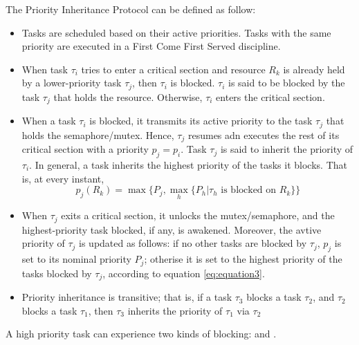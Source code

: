 The Priority Inheritance Protocol can be defined as follow:
\begin{itemize}
    \item Tasks are scheduled based on their active priorities. Tasks with the same priority are executed in a First Come First Served discipline.
    \item When task $\tau_i$ tries to enter a critical section and resource $R_k$ is already held by a lower-priority task $\tau_j$, then $\tau_i$ is blocked. $\tau_i$ is said to be blocked by the task $\tau_j$ that holds the resource. Otherwise, $\tau_i$ enters the critical section.
    \item When a task $\tau_i$ is blocked, it transmits its active priority to the task $\tau_j$ that holds the semaphore/mutex. Hence, $\tau_j$ resumes adn executes the rest of its critical section with a priority $p_j = p_i$. Task $\tau_j$ is said to inherit the priority of $\tau_i$. In general, a task inherits the highest priority of the tasks it blocks. That is, at every instant,
    \begin{equation}
        \label{eq:equation3}
        p_j(R_k) = \max \{P_j, \max_h \{P_h | \tau_h \text{ is blocked on }R_k\}\}
    \end{equation}
    \item When $\tau_j$ exits a critical section, it unlocks the mutex/semaphore, and the highest-priority task blocked, if any, is awakened. Moreover, the avtive priority of $\tau_j$ is updated as follows: if no other tasks are blocked by $\tau_j$, $p_j$ is set to its nominal priority $P_j$; otherise it is set to the highest priority of the tasks blocked by $\tau_j$, according to equation \ref{eq:equation3}.
    \item Priority inheritance is transitive; that is, if a task $\tau_3$ blocks a task $\tau_2$, and $\tau_2$ blocks a task $\tau_1$, then $\tau_3$ inherits the priority of $\tau_1$ via $\tau_2$
\end{itemize}

A high priority task can experience two kinds of blocking:  and .




